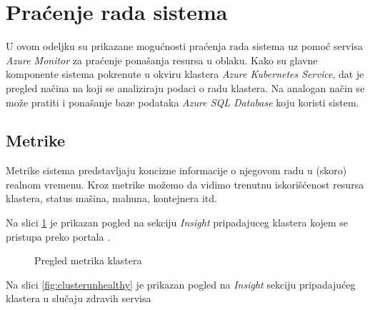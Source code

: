\documentclass[12pt,oneside]{memoir}
\begin{document}
\section{Praćenje rada sistema}
\label{chp:pracenjemetrika}

U ovom odeljku su prikazane mogućnosti praćenja rada sistema uz pomoć servisa \emph{Azure Monitor} za praćenje ponašanja resursa u oblaku. Kako su glavne komponente sistema pokrenute u okviru klastera \emph{Azure Kubernetes Service}, dat je pregled načina na koji se analiziraju podaci o radu klastera. Na analogan način se može pratiti i ponašanje baze podataka \emph{Azure SQL Database} koju koristi sistem.

\subsection{Metrike}

Metrike sistema predstavljaju koncizne informacije o njegovom radu u (skoro) realnom vremenu. Kroz metrike možemo da vidimo trenutnu iskorišćenost resursa klastera, status mašina, mahuna, kontejnera itd.

Na slici \ref{fig:aksinsights} je prikazan pogled na sekciju \emph{Insight} pripadajuceg klastera kojem se pristupa preko portala \cite{AzurePortal}.

\begin{figure}[!ht]
  \centering
  \caption{Pregled metrika klastera}
  \label{fig:aksinsights}
\end{figure}

Na slici \ref{fig:clusterunhealthy} je prikazan pogled na \emph{Insight} sekciju pripadajućeg klastera u slučaju zdravih servisa 
\end{document}
